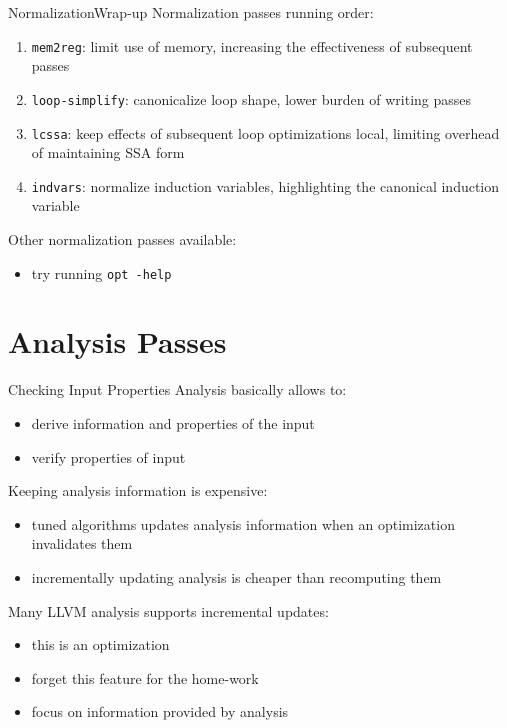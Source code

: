 \documentclass[10pt,mathserif]{beamer}
\begin{document}
\begin{frame}{Normalization}{Wrap-up}
Normalization passes running order:

\begin{enumerate}
\item \texttt{mem2reg}: limit use of memory, increasing the effectiveness of
       subsequent passes
\item \texttt{loop-simplify}: canonicalize loop shape, lower burden of writing
      passes
\item \texttt{lcssa}: keep effects of subsequent loop optimizations local,
      limiting overhead of maintaining SSA form
\item \texttt{indvars}: normalize induction variables, highlighting the
      canonical induction variable
\end{enumerate}

Other normalization passes available:

\begin{itemize}
\item try running \texttt{opt -help}
\end{itemize}
\end{frame}



\section{Analysis Passes}
\begin{frame}{Checking Input Properties}
Analysis basically allows to:

\begin{itemize}
\item \alert{derive} information and properties of the input
\item \alert{verify} properties of input
\end{itemize}

Keeping analysis information is expensive:

\begin{itemize}
\item tuned algorithms updates analysis information when an optimization
      invalidates them
\item incrementally updating analysis is cheaper than recomputing them
\end{itemize}

Many LLVM analysis supports incremental updates:

\begin{itemize}
\item this is an \alert{optimization}
\item forget this feature for the home-work
\item focus on \alert{information} provided by analysis
\end{itemize}
\end{frame}
\end{document}
